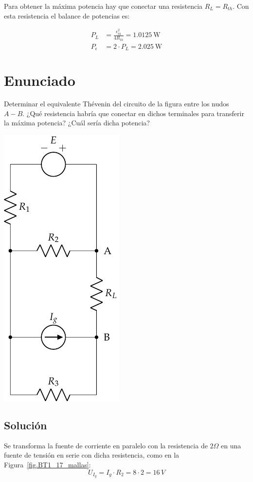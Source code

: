 Para obtener la máxima potencia hay que conectar una resistencia
$R_L = R_{th}$. Con esta resistencia el balance de potencias es:

\begin{align*}
  P_L &= \frac{\epsilon_{th}^2}{4R_{th}} = \SI{1.0125}{\watt}\\
  P_\epsilon &= 2 \cdot P_L = \SI{2.025}{\watt}
\end{align*}


\section{Enunciado}
Determinar el equivalente Thévenin del circuito de la figura entre los
nudos $A-B$. ¿Qué resistencia habría que conectar en dichos terminales
para transferir la máxima potencia? ¿Cuál sería dicha potencia?

\begin{center}
  \includegraphics{figuras/BT1_17.pdf}
\end{center}

\subsection*{Solución}
Se transforma la fuente de corriente en paralelo con la resistencia de
$2\Omega$ en una fuente de tensión en serie con dicha resistencia,
como en la Figura~\ref{fig.BT1_17_mallas}:
\begin{equation*}
  U_{I_g}=I_g\cdot R_2=8\cdot 2=16\, V
\end{equation*}


